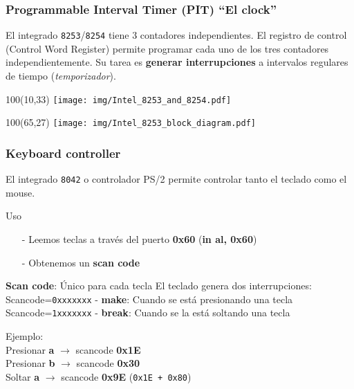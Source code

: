 \documentclass[aspectratio=169]{beamer}
\begin{document}
\begin{frame}[t]
    \frametitle{Programmable Interval Timer (PIT) ``El clock''}
    El integrado \texttt{8253}/\texttt{8254} tiene 3 contadores independientes.
    El registro de control (Control Word Register) permite programar cada uno de los tres contadores independientemente.
    Su tarea es \textbf{generar interrupciones} a intervalos regulares de tiempo (\emph{temporizador}).
    \begin{textblock}{100}(10,33) \texttt{[image: img/Intel\_8253\_and\_8254.pdf]} \end{textblock}
    \begin{textblock}{100}(65,27) \texttt{[image: img/Intel\_8253\_block\_diagram.pdf]} \end{textblock}
\end{frame}

\begin{frame}[t]
    \frametitle{Keyboard controller}
    El integrado \texttt{8042} o controlador PS/2 permite controlar tanto el teclado como el mouse.
    \pause
    \begin{block}{Uso}
    \begin{itemize}
        \item[-] Leemos teclas a través del puerto \textbf{0x60} (\textbf{in al, 0x60})
        \item[-] Obtenemos un \textbf{scan code}
    \end{itemize}
    \pause
    \end{block}
    \begin{block}{\textbf{Scan code}: Único para cada tecla}
        El teclado genera dos interrupciones:\\
        \hspace{1cm} Scancode=\texttt{0xxxxxxx} - \textbf{make}: Cuando se está presionando una tecla\\
        \hspace{1cm} Scancode=\texttt{1xxxxxxx} - \textbf{break}: Cuando se la está soltando una tecla
    \end{block}
    \pause
    \textcolor{verdeuca}{Ejemplo:}\\
    \hspace{2cm} Presionar \textbf{a} $\rightarrow$ scancode \textbf{0x1E}\\
    \pause
    \hspace{2cm} Presionar \textbf{b} $\rightarrow$ scancode \textbf{0x30}\\
    \pause
    \hspace{2cm} Soltar \textbf{a} $\rightarrow$ scancode \textbf{0x9E} (\texttt{0x1E + 0x80})
\end{frame}
\end{document}
